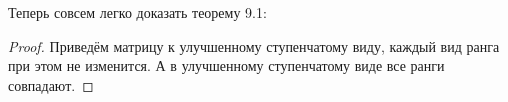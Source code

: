 Теперь совсем легко доказать теорему 9.1:

\begin{proof}
    Приведём матрицу к улучшенному ступенчатому виду, каждый вид ранга при этом не изменится. А в улучшенному ступенчатому виде все ранги совпадают.
\end{proof}

